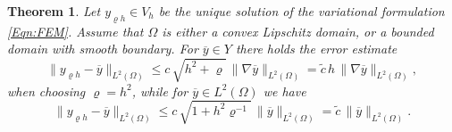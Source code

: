 \documentclass{article}
\newtheorem{theorem}{Theorem}
\numberwithin{equation}{section}
\begin{document}
\begin{theorem}
  Let $y_{\varrho h} \in V_h$ be the unique solution of the variational
  formulation \eqref{Eqn:FEM}. Assume that $\Omega$ is either a convex Lipschitz domain, or a bounded domain with smooth boundary. For $\overline{y} \in Y$ there holds the error estimate
  \begin{equation}\label{Eqn:Error Y}
    \| y_{\varrho h} - \overline{y} \|_{L^2(\Omega)} \leq
    c \, \sqrt{h^2 + \varrho} \, \| \nabla \overline{y} \|_{L^2(\Omega)} =
    \widetilde{c} \, h \, \| \nabla \overline{y} \|_{L^2(\Omega)},
  \end{equation}
  when choosing $\varrho = h^2$, while for $\overline{y} \in L^2(\Omega)$
  we have
   \begin{equation}\label{Eqn:Error L2}
    \| y_{\varrho h} - \overline{y} \|_{L^2(\Omega)} \leq
    c \, \sqrt{1 + h^2 \varrho^{-1}} \, \| \overline{y} \|_{L^2(\Omega)} =
    \widetilde{c} \, \| \overline{y} \|_{L^2(\Omega)}.
  \end{equation}
\end{theorem}
\end{document}
